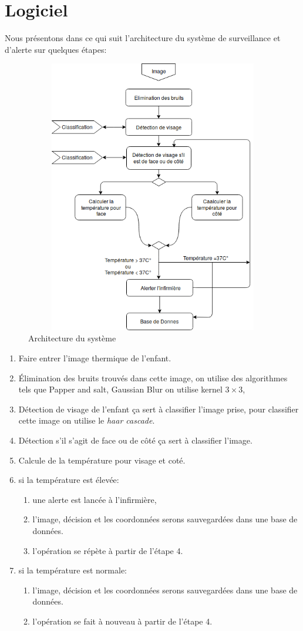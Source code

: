 \documentclass[12pt]{article}
\begin{document}
\section{Logiciel}
Nous présentons dans ce qui suit l'architecture du système de surveillance et d'alerte  sur quelques étapes:
\newpage
\begin{figure}[h]
	\centering
	\includegraphics[height=12cm,width=12cm]{img-Chapiter-3/Picture1.png}
	\caption{Architecture du système}
\end{figure}
\begin{enumerate}
	\item Faire entrer l’image thermique de l’enfant.
	\item \' Elimination des bruits trouvés dans cette image, on utilise des algorithmes tels que Papper and salt, Gaussian Blur on utilise kernel $3 \times 3$, 
	\item Détection de visage de l’enfant ça sert à classifier l’image prise, pour classifier cette image on utilise le \textit{haar cascade}.
	\item Détection s’il s’agit  de face ou de côté ça sert à classifier l’image.
	\item Calcule de la température pour visage et coté. 
	\item si la température est élevée:
	\begin{enumerate}
		\item une alerte est lancée à l’infirmière,
		\item l'image, décision et les coordonnées serons sauvegardées dans une base de données. 
		\item l’opération se répète à partir de  l’étape 4.
	\end{enumerate}
	\item si la température est normale:
	\begin{enumerate}
		\item l'image, décision et les coordonnées serons sauvegardées dans une base de données.
		\item l’opération se fait à nouveau à partir de l'étape 4.
	\end{enumerate}
\end{enumerate}
\end{document}

